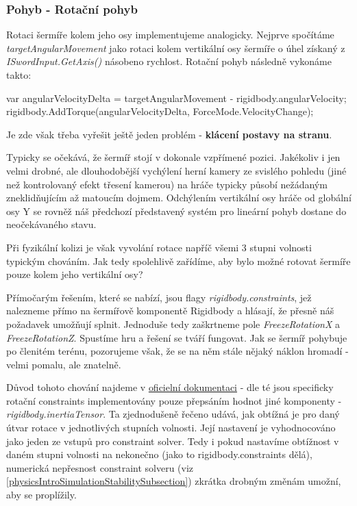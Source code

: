 \subsubsection*{Pohyb - Rotační pohyb}
Rotaci šermíře kolem jeho osy implementujeme analogicky. Nejprve spočítáme \textit{targetAngularMovement} jako rotaci kolem vertikální osy šermíře o úhel získaný z \textit{ISwordInput.GetAxis()} násobeno rychlost. Rotační pohyb následně vykonáme takto:

\begin{code}
 var angularVelocityDelta = 
     targetAngularMovement - rigidbody.angularVelocity;
 rigidbody.AddTorque(angularVelocityDelta, ForceMode.VelocityChange);
\end{code}

Je zde však třeba vyřešit ještě jeden problém - \textbf{klácení postavy na stranu}. 

Typicky se očekává, že šermíř stojí v dokonale vzpřímené pozici. Jakékoliv i jen velmi drobné, ale dlouhodobější vychýlení herní kamery ze svislého pohledu (jiné než kontrolovaný efekt třesení kamerou) na hráče typicky působí nežádaným zneklidňujícím až matoucím dojmem. Odchýlením vertikální osy hráče od globální osy Y se rovněž náš předchozí představený systém pro lineární pohyb dostane do neočekávaného stavu. 

Při fyzikální kolizi je však vyvolání rotace napříč všemi 3 stupni volnosti typickým chováním. Jak tedy spolehlivě zařídíme, aby bylo možné rotovat šermíře pouze kolem jeho vertikální osy?

Přímočarým řešením, které se nabízí, jsou flagy \textit{rigidbody.constraints}, jež nalezneme přímo na šermířově komponentě Rigidbody a hlásají, že přesně náš požadavek umožňují splnit. Jednoduše tedy zaškrtneme pole \textit{FreezeRotationX} a \textit{FreezeRotationZ}. Spustíme hru a řešení se tváří fungovat. Jak se šermíř pohybuje po členitém terénu, pozorujeme však, že se na něm stále nějaký náklon hromadí - velmi pomalu, ale znatelně.

Důvod tohoto chování najdeme v \href{https://docs.unity3d.com/2022.2/Documentation/ScriptReference/Rigidbody-inertiaTensor.html}{oficielní dokumentaci} \cite{Unity} - dle té jsou specificky rotační constraints implementovány pouze přepsáním hodnot jiné komponenty - \textit{rigidbody.inertiaTensor}. Ta zjednodušeně řečeno udává, jak obtížná je pro daný útvar rotace v jednotlivých stupních volnosti. Její nastavení je vyhodnocováno jako jeden ze vstupů pro constraint solver. Tedy i pokud nastavíme obtížnost v daném stupni volnosti na nekonečno (jako to rigidbody.constraints dělá), numerická nepřesnost constraint solveru (viz \ref{physicsIntroSimulationStabilitySubsection}) zkrátka drobným změnám umožní, aby se proplížily.

